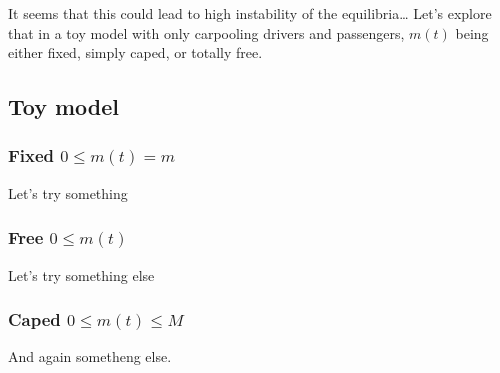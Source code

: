 \documentclass[english, a4paper]{article}
\theoremstyle{plain}
\begin{document}
It seems that this could lead to high instability of the equilibria… Let’s explore that in a toy model with only carpooling drivers and passengers, $m(t)$ being either fixed, simply caped, or totally free.

\subsection{Toy model}
\subsubsection{Fixed $0 \leq m(t) = m$}
Let’s try something


\subsubsection{Free $0 \leq m(t)$}
Let’s try something else

\subsubsection{Caped $0 \leq m(t) \leq M$}
And again sometheng else.
\end{document}
